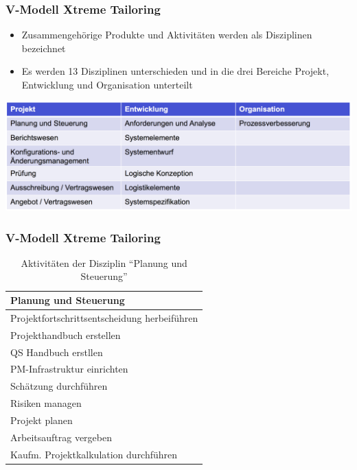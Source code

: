 \begin{frame}
\frametitle{V-Modell Xtreme Tailoring}
	\begin{itemize}
		\item Zusammengehörige Produkte und Aktivitäten werden als Disziplinen
		bezeichnet
		\item Es werden 13 Disziplinen unterschieden und in die drei Bereiche
		Projekt, Entwicklung und Organisation unterteilt
	\end{itemize}
	\center\includegraphics[width=1\textwidth,
			keepaspectratio=true]{bilder/vmodell_disziplinen.png}
\end{frame}

\begin{frame}
\frametitle{V-Modell Xtreme Tailoring}
	\begin{table}
		\caption{Aktivitäten der Disziplin ``Planung und Steuerung''}
		\begin{tabular}{l}
				Planung und Steuerung\\ \hline
				Projektfortschrittsentscheidung herbeiführen \\
				Projekthandbuch erstellen \\
				QS Handbuch erstllen \\
				PM-Infrastruktur einrichten \\
				Schätzung durchführen \\
				Risiken managen \\
				Projekt planen \\
				Arbeitsauftrag vergeben \\
				Kaufm. Projektkalkulation durchführen
		\end{tabular}
	\end{table}
\end{frame}

